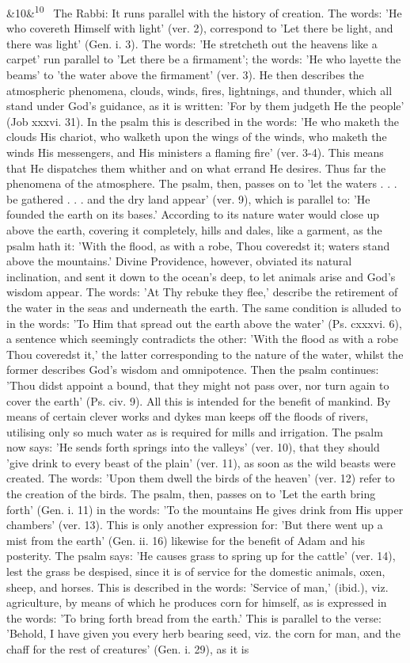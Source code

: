 \documentclass[12pt]{article}
\newcommand{\para}[1][]{\par\noindent\ifx&#1&\else\textsuperscript{\footnotesize #1}~\fi}
\begin{document}
\para[10] The Rabbi: It runs parallel with the history of creation. The words: 'He who covereth Himself with light' (ver. 2), correspond to 'Let there be light, and there was light' (Gen. i. 3). The words: 'He stretcheth out the heavens like a carpet' run parallel to 'Let there be a firmament'; the words: 'He who layette the beams' to 'the water above the firmament' (ver. 3). He then describes the atmospheric phenomena, clouds, winds, fires, lightnings, and thunder, which all stand under God's guidance, as it is written: 'For by them judgeth He the people' (Job xxxvi. 31). In the psalm this is described in the words: 'He who maketh the clouds His chariot, who walketh upon the wings of the winds, who maketh the winds His messengers, and His ministers a flaming fire' (ver. 3-4). This means that He dispatches them whither and on what errand He desires. Thus far the phenomena of the atmosphere. The psalm, then, passes on to 'let the waters . . . be gathered . . . and the dry land appear' (ver. 9), which is parallel to: 'He founded the earth on its bases.' According to its nature water would close up above the earth, covering it completely, hills and dales, like a garment, as the psalm hath it: 'With the flood, as with a robe, Thou coveredst it; waters stand above the mountains.' Divine Providence, however, obviated its natural inclination, and sent it down to the ocean's deep, to let animals arise and God's wisdom appear. The words: 'At Thy rebuke they flee,' describe the retirement of the water in the seas and underneath the earth. The same condition is alluded to in the words: 'To Him that spread out the earth above the water' (Ps. cxxxvi. 6), a sentence which seemingly contradicts the other: 'With the flood as with a robe Thou coveredst it,' the latter corresponding to the nature of the water, whilst the former describes God's wisdom and omnipotence. Then the psalm continues: 'Thou didst appoint a bound, that they might not pass over, nor turn again to cover the earth' (Ps. civ. 9). All this is intended for the benefit of mankind. By means of certain clever works and dykes man keeps off the floods of rivers, utilising only so much water as is required for mills and irrigation. The psalm now says: 'He sends forth springs into the valleys' (ver. 10), that they should 'give drink to every beast of the plain' (ver. 11), as soon as the wild beasts were created. The words: 'Upon them dwell the birds of the heaven' (ver. 12) refer to the creation of the birds. The psalm, then, passes on to 'Let the earth bring forth' (Gen. i. 11) in the words: 'To the mountains He gives drink from His upper chambers' (ver. 13). This is only another expression for: 'But there went up a mist from the earth' (Gen. ii. 16) likewise for the benefit of Adam and his posterity. The psalm says: 'He causes grass to spring up for the cattle' (ver. 14), lest the grass be despised, since it is of service for the domestic animals, oxen, sheep, and horses. This is described in the words: 'Service of man,' (ibid.), viz. agriculture, by means of which he produces corn for himself, as is expressed in the words: 'To bring forth bread from the earth.' This is parallel to the verse: 'Behold, I have given you every herb bearing seed, viz. the corn for man, and the chaff for the rest of creatures' (Gen. i. 29), as it is 
\end{document}
